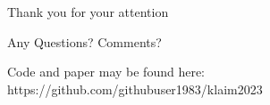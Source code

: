 \documentclass[
	11pt, %
]{beamer}
\begin{document}






\begin{frame}[plain] %
	\begin{center}
		{\Huge Thank you for your attention}
		
		\bigskip\bigskip %
		
		{\LARGE Any Questions? Comments?}
		
		\bigskip
		Code and paper may be found here: https://github.com/githubuser1983/klaim2023
	\end{center}
\end{frame}
\end{document}
